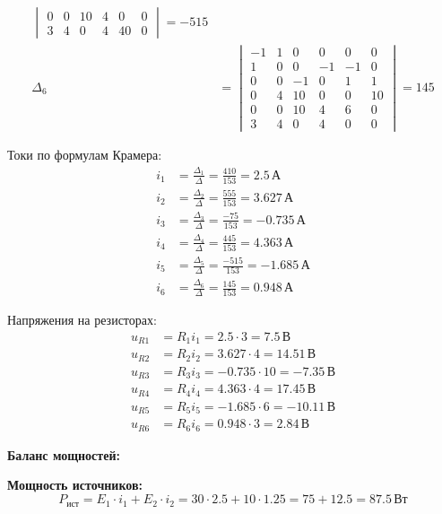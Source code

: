 \begin{align}
\begin{vmatrix}
 0 &  0 & 10 &  4 &  0 &  0 \\
 3 &  4 &  0 &  4 & 40 &  0
\end{vmatrix} = -515 \\
\Delta_6 &= \begin{vmatrix}
-1 &  1 &  0 &  0 &  0 &  0 \\
 1 &  0 &  0 & -1 & -1 &  0 \\
 0 &  0 & -1 &  0 &  1 &  1 \\
 0 &  4 & 10 &  0 &  0 & 10 \\
 0 &  0 & 10 &  4 &  6 &  0 \\
 3 &  4 &  0 &  4 &  0 &  0
\end{vmatrix} = 145
\end{align}

Токи по формулам Крамера:
\begin{align}
i_1 &= \frac{\Delta_1}{\Delta} = \frac{410}{153} = 2.5\,\text{А} \\
i_2 &= \frac{\Delta_2}{\Delta} = \frac{555}{153} = 3.627\,\text{А} \\
i_3 &= \frac{\Delta_3}{\Delta} = \frac{-75}{153} = -0.735\,\text{А} \\
i_4 &= \frac{\Delta_4}{\Delta} = \frac{445}{153} = 4.363\,\text{А} \\
i_5 &= \frac{\Delta_5}{\Delta} = \frac{-515}{153} = -1.685\,\text{А} \\
i_6 &= \frac{\Delta_6}{\Delta} = \frac{145}{153} = 0.948\,\text{А}
\end{align}

Напряжения на резисторах:
\begin{align*}
u_{R1} &= R_1 i_1 = 2.5 \cdot 3 = 7.5\,\text{В} \\
u_{R2} &= R_2 i_2 = 3.627 \cdot 4 = 14.51\,\text{В} \\
u_{R3} &= R_3 i_3 = -0.735 \cdot 10 = -7.35\,\text{В} \\
u_{R4} &= R_4 i_4 = 4.363 \cdot 4 = 17.45\,\text{В} \\
u_{R5} &= R_5 i_5 = -1.685 \cdot 6 = -10.11\,\text{В} \\
u_{R6} &= R_6 i_6 = 0.948 \cdot 3 = 2.84\,\text{В}
\end{align*}

\textbf{Баланс мощностей:}

\textbf{Мощность источников:}
\begin{equation}
P_{\text{ист}} = E_1 \cdot i_1 + E_2 \cdot i_2 = 30 \cdot 2.5 + 10 \cdot 1.25 = 75 + 12.5 = 87.5\,\text{Вт}
\end{equation}

